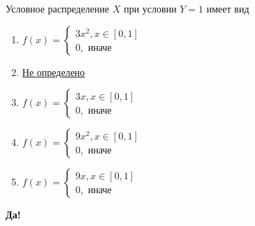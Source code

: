 \documentclass[t]{beamer}
\begin{document}
 \begin{frame} \label{34-Yes} 
\begin{block}{34} 

  Условное распределение $X$ при условии $Y=1$ имеет вид
  


 \end{block} 
\begin{enumerate} 
\item[] \hyperlink{34-Yes}{\beamergotobutton{} $ f(x) = \begin{cases}
	3 x^2 , x \in [0,1] \\
	0,\text{ иначе}
	\end{cases} $}
\item[] \hyperlink{34-No}{\beamergotobutton{} Не определено}
\item[] \hyperlink{34-No}{\beamergotobutton{} $ f(x) = \begin{cases}
	3 x , x \in [0,1] \\
	0,\text{ иначе}
	\end{cases}  $}
\item[] \hyperlink{34-No}{\beamergotobutton{} $ f(x) = \begin{cases}
	9 x^2 , x \in [0,1] \\
	0,\text{ иначе}
	\end{cases}  $}
\item[] \hyperlink{34-No}{\beamergotobutton{} $ f(x) = \begin{cases}
	9 x , x \in [0,1] \\
	0,\text{ иначе}
	\end{cases}  $}
\end{enumerate} 

 \textbf{Да!} 
 \hyperlink{35}{}\end{frame} 
\end{document}
